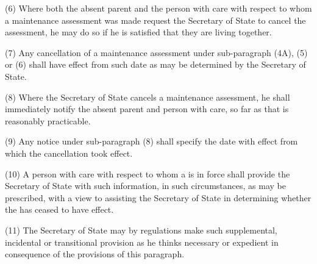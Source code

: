 \documentclass[12pt,a4paper]{article}
\begin{document}
{(6)
Where both the absent parent and the person with care with respect to whom a maintenance assessment was made request the Secretary of State to cancel the assessment, he may do so if he is satisfied that they are living together.

(7)
Any cancellation of a maintenance assessment under sub-paragraph (4A), (5) or (6) shall have effect from such date as may be determined by the Secretary of State.

(8)
Where the Secretary of State cancels a maintenance assessment, he shall immediately notify the absent parent and person with care, so far as that is reasonably practicable.

(9)
Any notice under sub-paragraph (8) shall specify the date with effect from which the cancellation took effect.

}

(10) A person with care with respect to whom a  is in force shall provide the Secretary of State with such information, in such circumstances, as may be prescribed, with a view to assisting the Secretary of State in determining whether the  has ceased to have effect.

(11) The Secretary of State may by regulations make such supplemental, incidental or transitional provision as he thinks necessary or expedient in consequence of the provisions of this paragraph.
\end{document}
